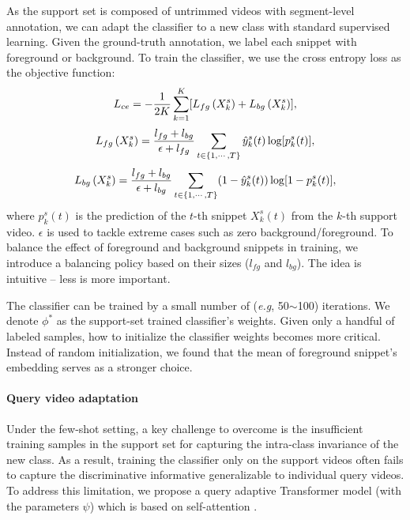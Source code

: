 \documentclass{bmvc2k}
\def\eg{\emph{e.g}\bmvaOneDot}
\begin{document}
As the support set is composed of untrimmed videos with segment-level annotation, 
we can adapt the classifier to a new class with standard supervised learning.
Given the ground-truth annotation,
we label each snippet with foreground or background.
To train the classifier, we use the cross entropy loss as the objective function:
\begin{equation}\label{eqn_2}
\centering
\begin{aligned}
{L}_{ce} = - \frac{1}{2K}\sum_{k = 1}^{K} [{L}_{fg}\left ( {X}^s_{k}\right ) + {L}_{bg}\left ( {X}^s_{k}\right )], 
\end{aligned}
\end{equation}
\begin{equation}\label{eqn_3}
\centering
\begin{aligned}
{L}_{fg}\left ({X}_{k}^s\right ) = \frac{l_{fg} + l_{bg}}{\epsilon + l_{fg}}\sum_{t \in \{1,\cdots,T\}}
\hat{y}^{s}_k(t) \log[p_{k}^s(t)],
\end{aligned}
\end{equation}
\begin{equation}\label{eqn_4}
\centering
\begin{aligned}
{L}_{bg}\left ({X}_{k}^s\right ) = \frac{l_{fg} + l_{bg}}{\epsilon + l_{bg}}\sum_{t \in \{1,\cdots,T\}}
(1-\hat{y}^{s}_k(t)) \log[1-p_{k}^s(t)], 
\end{aligned}
\end{equation}
where $p_{k}^s(t)$
is the prediction of the $t$-th snippet $X_k^s(t)$
from the $k$-th support video.
$\epsilon$ is used to tackle extreme cases
such as zero background/foreground.
To balance the effect of foreground and background snippets in training, we introduce a balancing policy based on their sizes
($l_{fg}$ and $l_{bg}$).
The idea is intuitive -- less is more important.




The classifier can be trained by a small number of (\eg, 50$\sim$100) iterations.
We denote $\phi^*$ as the support-set trained classifier's weights.
Given only a handful of labeled samples,
how to initialize the classifier weights becomes more critical. Instead of random initialization, we found that the mean of foreground snippet's embedding serves as a stronger choice.






\paragraph{Query video adaptation}
Under the few-shot setting, a key challenge to overcome is the insufficient training samples in the support set for  capturing the intra-class invariance of the new class. As a result, training the classifier only on the support videos often fails to capture the discriminative informative generalizable to individual query videos.
To address this limitation, we propose a query adaptive Transformer model (with the parameters $\psi$) 
which is based on self-attention  \cite{vaswani2017attention}.
\end{document}
